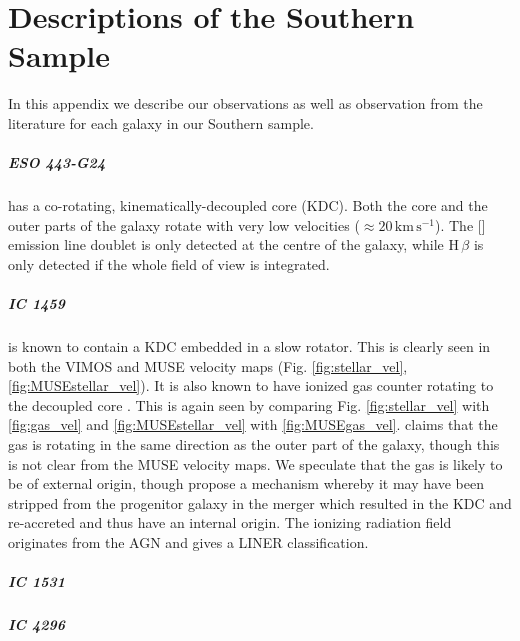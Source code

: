 \chapter{Descriptions of the Southern Sample}
	\label{cha:Description}
In this appendix we describe our observations as well as observation from the literature for each galaxy in our Southern sample. 

\paragraph{ESO 443-G24} has a co-rotating, kinematically-decoupled core (KDC). Both the core and the outer parts of the galaxy rotate with very low velocities ($\approx 20\,\mathrm{km\,s^{-1}}$). The [] emission line doublet is only detected at the centre of the galaxy, while H\,$\beta$ is only detected if the whole field of view is integrated. 

\paragraph{IC 1459} is known to contain a KDC \citep{Franx1988} embedded in a slow rotator. This is clearly seen in both the VIMOS and MUSE velocity maps (Fig. \ref{fig:stellar_vel}, \ref{fig:MUSEstellar_vel}). It is also known to have ionized gas counter rotating to the decoupled core \citep{VerdoesKleijn2000}. This is again seen by comparing Fig. \ref{fig:stellar_vel} with \ref{fig:gas_vel} and \ref{fig:MUSEstellar_vel} with \ref{fig:MUSEgas_vel}. \citet{Franz1988} claims that the gas is rotating in the same direction as the outer part of the galaxy, though this is not clear from the MUSE velocity maps. We speculate that the gas is likely to be of external origin, though propose a mechanism whereby it may have been stripped from the progenitor galaxy in the merger which resulted in the KDC and re-accreted and thus have an internal origin. The ionizing radiation field originates from the AGN and gives a LINER classification.

\paragraph{IC 1531}

\paragraph{IC 4296}

